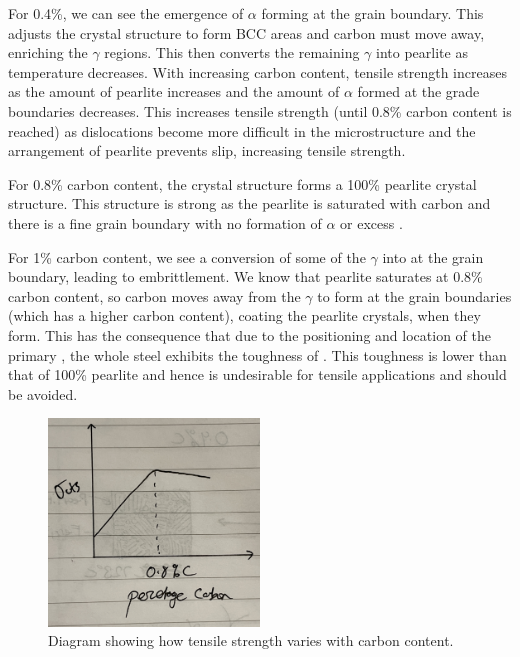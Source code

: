 \documentclass[11pt]{article}
\begin{document}
For 0.4\%, we can see the emergence of $\alpha$ forming at the grain boundary. This adjusts the crystal structure to form BCC areas and carbon must move away, enriching the $\gamma$ regions. This then converts the remaining $\gamma$ into pearlite as temperature decreases. With increasing carbon content, tensile strength increases as the amount of pearlite increases and the amount of $\alpha$ formed at the grade boundaries decreases. This increases tensile strength (until 0.8\% carbon content is reached) as dislocations become more difficult in the microstructure and the arrangement of pearlite prevents slip, increasing tensile strength.

For 0.8\% carbon content, the crystal structure forms a 100\% pearlite crystal structure. This structure is strong as the pearlite is saturated with carbon and there is a fine grain boundary with no formation of $\alpha$ or excess .

For 1\% carbon content, we see a conversion of some of the $\gamma$ into  at the grain boundary, leading to embrittlement. We know that pearlite saturates at 0.8\% carbon content, so carbon moves away from the $\gamma$ to form  at the grain boundaries (which has a higher carbon content), coating the pearlite crystals, when they form. This has the consequence that due to the positioning and location of the primary , the whole steel exhibits the toughness of . This toughness is lower than that of 100\% pearlite and hence is undesirable for tensile applications and should be avoided. 
\begin{figure}[H]
    \centering
    \includegraphics[width = 0.5\textwidth]{./img/q1c.jpg}
    \caption{Diagram showing how tensile strength varies with carbon content.}
\end{figure}
\end{document}
